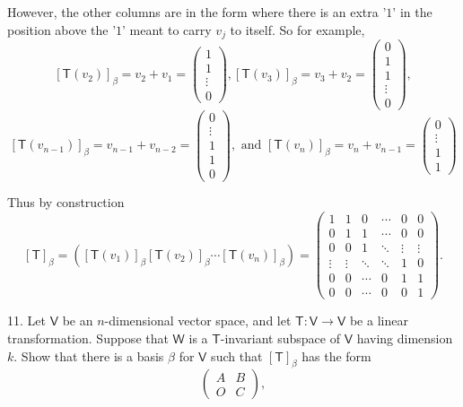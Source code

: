 \documentclass[11pt]{article}
\newcommand{\br}[1]{\left(#1\right)}
\newcommand{\sbr}[1]{\left[#1\right]}
\begin{document}
However, the other columns are in the form where there is an extra '$1$' in the position above the '$1$' meant to carry $v_j$ to itself. So for example, $$\sbr{\mathsf{T}(v_2)}_{\beta} = v_2+v_1 = \begin{pmatrix}
    1 \\
    1 \\
    \vdots \\
    0
\end{pmatrix}, \sbr{\mathsf{T}(v_3)}_{\beta} = v_3+v_2 = \begin{pmatrix}
    0 \\
    1 \\
    1 \\
    \vdots \\
    0
\end{pmatrix},$$
$$\sbr{\mathsf{T}(v_{n-1})}_{\beta} = v_{n-1}+v_{n-2} = \begin{pmatrix}
    0 \\
    \vdots \\
    1 \\
    1 \\
    0
\end{pmatrix}, \text{ and } \sbr{\mathsf{T}(v_n)}_{\beta} = v_n+v_{n-1} = \begin{pmatrix}
    0 \\
    \vdots \\
    1 \\
    1
\end{pmatrix}$$

Thus by construction $$\sbr{\mathsf{T}}_{\beta} = \br{\sbr{\mathsf{T}(v_1)}_{\beta} \sbr{\mathsf{T}(v_2)}_{\beta} \cdots \sbr{\mathsf{T}(v_n)}_{\beta}} = \begin{pmatrix}
    1 & 1 & 0 & \cdots & 0 & 0 \\
    0 & 1 & 1 & \cdots & 0 & 0 \\
    0 & 0 & 1 & \ddots & \vdots & \vdots \\
    \vdots & \vdots & \ddots & \ddots & 1 & 0 \\
    0 & 0 & \cdots & 0 & 1 & 1 \\
    0 & 0 & \cdots & 0 & 0 & 1
\end{pmatrix}.$$

11. Let $\mathsf{V}$ be an $n$-dimensional vector space, and let $\mathsf{T} : \mathsf{V}\to \mathsf{V}$ be a linear transformation. Suppose that $\mathsf{W}$ is a $\mathsf{T}$-invariant subspace of $\mathsf{V}$ having dimension $k$. Show that there is a basis $\beta$ for $\mathsf{V}$ such that $\sbr{\mathsf{T}}_{\beta}$ has the form $$\begin{pmatrix}
    A & B \\
    O & C
\end{pmatrix},$$
\end{document}
